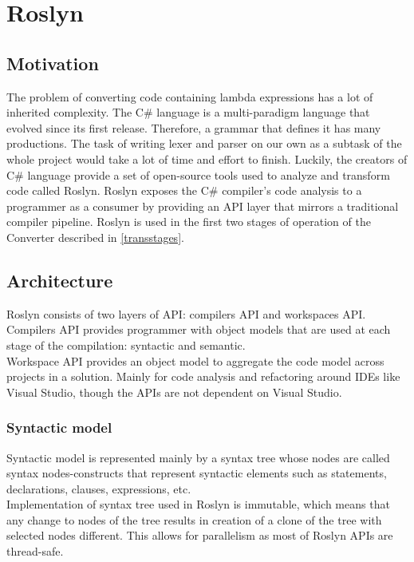 \documentclass[]{report}
\begin{document}
    \section{Roslyn}
    \subsection{Motivation}
    The problem of converting code containing lambda expressions has a lot of inherited complexity. The C\# language is a multi-paradigm language that evolved since its first release. Therefore, a grammar that defines it has many productions. The task of writing lexer and parser on our own as a subtask of the whole project would take a lot of time and effort to finish. Luckily, the creators of C\# language provide a set of open-source tools used to analyze and transform code called Roslyn. Roslyn exposes the C\#  compiler’s code analysis to a programmer as a consumer by providing an API layer that mirrors a traditional compiler pipeline. \cite{roslynrepo} Roslyn is used in the first two stages of operation of the Converter described in \ref{transstages}.

    \subsection{Architecture}
   
    Roslyn consists of two layers of API: compilers API and workspaces API.\\
    Compilers API provides programmer with object models that are used at each stage of the compilation: syntactic and semantic.\\
    Workspace API provides an object model to aggregate the code model across projects in a solution. Mainly for code analysis and refactoring around IDEs like Visual Studio, though the APIs are not dependent on Visual Studio\cite{workspaceapi}. 
    
    \subsubsection{Syntactic model}
    Syntactic model is represented mainly by a syntax tree whose nodes are called syntax nodes-constructs that represent syntactic elements such as statements, declarations, clauses, expressions, etc.\\ Implementation of syntax tree used in Roslyn is immutable, which means that any change to nodes of the tree results in creation of a clone of the tree with selected nodes different. This allows for parallelism as most of Roslyn APIs are thread-safe.
    
\end{document}
